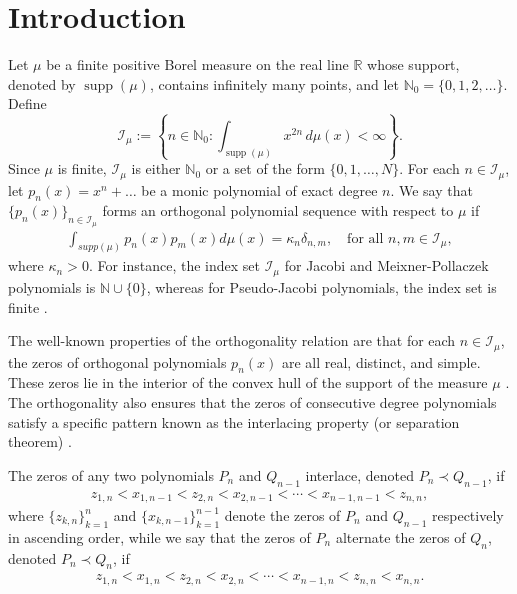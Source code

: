 \documentclass[final,3p,times,12pt]{elsarticle}
\numberwithin{equation}{section}  %
\begin{document}
	
	\section{Introduction}
	

Let $\mu$ be a finite positive Borel measure on the real line $\mathbb{R}$ whose support, denoted by $\operatorname{supp}(\mu)$, contains infinitely many points, and let $\mathbb{N}_0=\{0,1,2,\dots\}$. Define
   \[\mathcal{I}_\mu:=\left\{n\in\mathbb{N}_0 :\int_{\operatorname{supp}(\mu)} x^{2n}\,d\mu(x)<\infty\right\}.\] Since $\mu$ is finite, $\mathcal{I}_\mu$ is either $\mathbb{N}_0$ or a  set of the form $\{0,1,\dots,N\}$. For each $n\in \mathcal{I_\mu}$, let $p_n(x) = x^n + \dots$ be a monic polynomial of exact degree $n$. We say that $\{p_n(x)\}_{n \in \mathcal{I_\mu}}$ forms an orthogonal polynomial sequence with respect to $\mu$ if
	\begin{align}
		\int_{supp(\mu)} p_n(x)p_m(x) d\mu(x) = \kappa_n \delta_{n,m}, \quad \text{for all } n, m \in \mathcal{I_\mu},
	\end{align}
	where $\kappa_n > 0$.  For instance, the index set $\mathcal{I}_{\mu}$ for Jacobi and Meixner-Pollaczek polynomials is $\mathbb{N}\cup \{0\}$, whereas for Pseudo-Jacobi polynomials, the index set is finite \cite{Koekoek-Book-HypergeometricOP}. 
    
    The well-known properties of the orthogonality relation are that for each $n \in \mathcal{I}_{\mu}$, the zeros of orthogonal polynomials $p_n(x)$ are all real, distinct, and simple. These zeros lie in the interior of the convex hull of the support of the measure $\mu$ \cite{Ismail-Book-OP-2009}. The orthogonality also ensures that the zeros of consecutive degree polynomials satisfy a specific pattern known as the interlacing property (or separation theorem) \cite{Chiharabook}.
    
	The zeros of any two polynomials $P_n$ and $Q_{n-1}$ interlace, denoted $P_n \prec Q_{n-1}$, if
	\begin{align}
		z_{1,n} < x_{1,n-1} < z_{2,n} < x_{2,n-1} < \cdots < x_{n-1,n-1} < z_{n,n},
	\end{align}
	where $\{z_{k,n}\}_{k=1}^n$ and $\{x_{k,n-1}\}_{k=1}^{n-1}$ denote the zeros of $P_n$ and $Q_{n-1}$  respectively in ascending order, while we say that the zeros of $P_n$ alternate the zeros of $Q_{n}$, denoted $P_n \prec Q_n$, if
	\begin{align}
		z_{1,n} < x_{1,n} < z_{2,n} <x_{2,n}< \cdots < x_{n-1,n} < z_{n,n} < x_{n,n}.
	\end{align}
	
\end{document}
